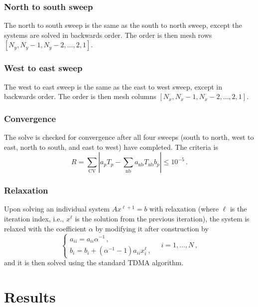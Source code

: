 \documentclass{article}
\begin{document}
\subsubsection*{North to south sweep}

The north to south sweep is the same as the south to north sweep, except the systems are solved in backwards order. The order is then mesh rows $[N_y, N_y - 1, N_y - 2, \ldots, 2, 1]$.

\subsubsection*{West to east sweep}

The west to east sweep is the same as the east to west sweep, except in backwards order. The order is then mesh columns $[N_x, N_x - 1, N_x - 2, \ldots, 2, 1]$.

\subsubsection*{Convergence}

The solve is checked for convergence after all four sweeps (south to north, west to east, north to south, and east to west) have completed. The criteria is
\begin{equation}
	R = \sum_\text{CV} \left| a_p T_p - \sum_{\text{nb}} a_\text{nb} T_\text{nb} b_p\right|\leq 10^{-5}\,.
\end{equation}

\subsubsection*{Relaxation}

Upon solving an individual system $Ax^{\ell + 1} = b$ with relaxation (where $\ell$ is the iteration index, i.e., $x^\ell$ is the solution from the previous iteration), the system is relaxed with the coefficient $\alpha$ by modifying it after construction by
\[
	\begin{cases}
		a_{ii} = a_{ii} \alpha^{-1}\,,\\
		b_i = b_i + (\alpha^{-1} - 1) a_{ii} x_i^\ell\,,
	\end{cases} \quad i = 1, \ldots, N\,,
\]
and it is then solved using the standard TDMA algorithm.

\section*{Results}
\end{document}
